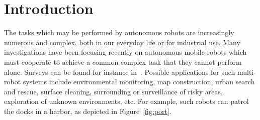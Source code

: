 
\chapter{Introduction}
	

The tasks which may be performed by autonomous robots are increasingly numerous and complex, 
both in our everyday life or for industrial use.
Many investigations have been focusing recently on %
autonomous mobile robots %
which must cooperate to achieve a common complex task that they cannot perform alone. 
Surveys can be found for instance in~\cite{Prencipe13, butucaru_distributed_2011,FPS12}. 
Possible applications for such multi-robot systems include environmental monitoring, map construction, urban search and rescue, surface cleaning, surrounding or surveillance of risky areas, exploration of unknown environments, etc.
For example, such robots can patrol the docks in a harbor, as depicted in Figure~\ref{fig:port}.
